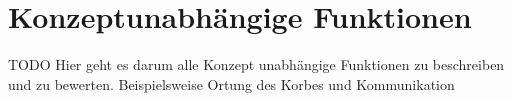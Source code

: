 \section{Konzeptunabhängige Funktionen}
TODO Hier geht es darum alle Konzept unabhängige Funktionen zu beschreiben und zu bewerten. Beispielsweise Ortung des Korbes und Kommunikation